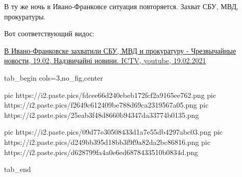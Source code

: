 В ту же ночь в Ивано-Франковсе ситуация повторяется. Захват СБУ, МВД,
прокуратуры.

Вот соответствующий видос:

\href{https://www.youtube.com/watch?v=v1mlKpVlpc8}{%
В Ивано-Франковске захватили СБУ, МВД и прокуратуру - Чрезвычайные новости, 19.02, %
Надзвичайні новини. ICTV, youtube, 19.02.2021%
}


\ifcmt
  tab_begin cols=3,no_fig,center

     pic https://i2.paste.pics/fdcee66d240ebeb172fcf2a9165ee762.png
		 pic https://i2.paste.pics/f2649c612409be788d69ca2319567a05.png
		 pic https://i2.paste.pics/25eab3f48d8660b94347da33774b0135.png

		 pic https://i2.paste.pics/09d77e30508433d1a7e55db4297abc03.png
		 pic https://i2.paste.pics/d249bb395d18bb3f9f9a82da2bc86816.png
		 pic https://i2.paste.pics/d628799fa4a0e6ed6878433510b0834d.png

  tab_end
\fi
